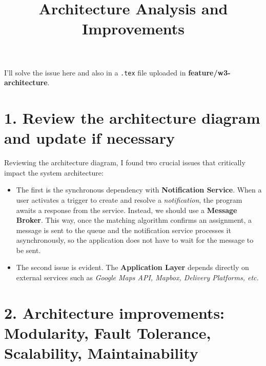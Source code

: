 \documentclass[12pt]{article}
\title{Architecture Analysis and Improvements}
\author{}
\date{}
\begin{document}
\maketitle

I'll solve the issue here and also in a \texttt{.tex} file uploaded in \textbf{feature/w3-architecture}.

\section*{1. Review the architecture diagram and update if necessary}

Reviewing the architecture diagram, I found two crucial issues that critically impact the system architecture:

\begin{itemize}
    \item The first is the synchronous dependency with \textbf{Notification Service}. When a user activates a trigger to create and resolve a \textit{notification}, the program awaits a response from the service. Instead, we should use a \textbf{Message Broker}. This way, once the matching algorithm confirms an assignment, a message is sent to the queue and the notification service processes it asynchronously, so the application does not have to wait for the message to be sent.
    
    \item The second issue is evident. The \textbf{Application Layer} depends directly on external services such as \textit{Google Maps API, Mapbox, Delivery Platforms, etc.}
\end{itemize}

\section*{2. Architecture improvements: Modularity, Fault Tolerance, Scalability, Maintainability}
\end{document}
